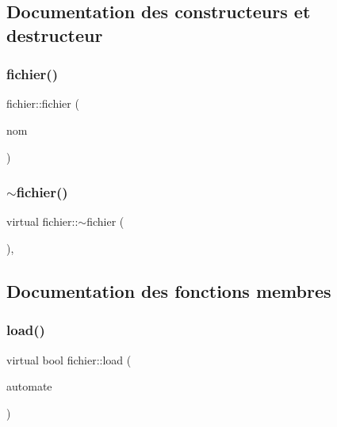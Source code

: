 \subsection{Documentation des constructeurs et destructeur}
\mbox{\label{classfichier_a42004721e8f3931e39b12a513e12f48e}} 
\subsubsection{\texorpdfstring{fichier()}{fichier()}}
{\footnotesize\ttfamily fichier\+::fichier (\begin{DoxyParamCaption}\item[{const std\+::string}]{nom }\end{DoxyParamCaption})\hspace{0.3cm}{\ttfamily [inline]}}

\mbox{\label{classfichier_aa9d389401e8d59b50377c472fb37b5da}} 
\subsubsection{\texorpdfstring{$\sim$fichier()}{~fichier()}}
{\footnotesize\ttfamily virtual fichier\+::$\sim$fichier (\begin{DoxyParamCaption}{ }\end{DoxyParamCaption})\hspace{0.3cm}{\ttfamily [inline]}, {\ttfamily [virtual]}}



\subsection{Documentation des fonctions membres}
\mbox{\label{classfichier_a6c246db929cf6532eb3f12c2b39574d5}} 
\subsubsection{\texorpdfstring{load()}{load()}}
{\footnotesize\ttfamily virtual bool fichier\+::load (\begin{DoxyParamCaption}\item[{const \mbox{\hyperlink{class_cellular_automata}{Cellular\+Automata}} $\ast$}]{automate }\end{DoxyParamCaption})\hspace{0.3cm}{\ttfamily [pure virtual]}}



